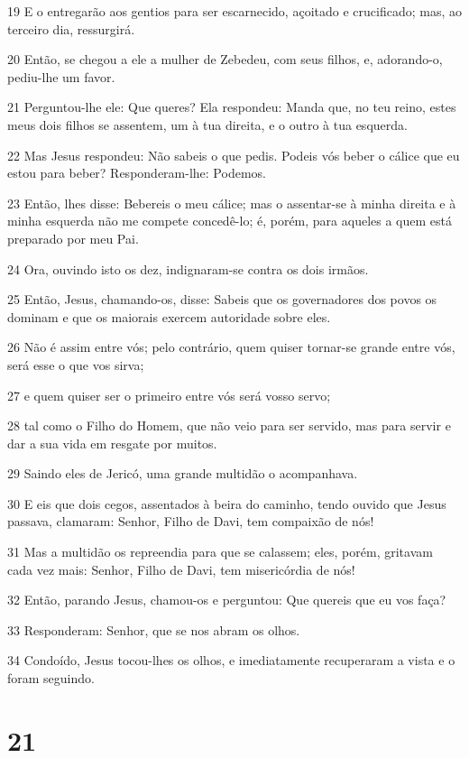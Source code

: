 \par 19 E o entregarão aos gentios para ser escarnecido, açoitado e crucificado; mas, ao terceiro dia, ressurgirá.
\par 20 Então, se chegou a ele a mulher de Zebedeu, com seus filhos, e, adorando-o, pediu-lhe um favor.
\par 21 Perguntou-lhe ele: Que queres? Ela respondeu: Manda que, no teu reino, estes meus dois filhos se assentem, um à tua direita, e o outro à tua esquerda.
\par 22 Mas Jesus respondeu: Não sabeis o que pedis. Podeis vós beber o cálice que eu estou para beber? Responderam-lhe: Podemos.
\par 23 Então, lhes disse: Bebereis o meu cálice; mas o assentar-se à minha direita e à minha esquerda não me compete concedê-lo; é, porém, para aqueles a quem está preparado por meu Pai.
\par 24 Ora, ouvindo isto os dez, indignaram-se contra os dois irmãos.
\par 25 Então, Jesus, chamando-os, disse: Sabeis que os governadores dos povos os dominam e que os maiorais exercem autoridade sobre eles.
\par 26 Não é assim entre vós; pelo contrário, quem quiser tornar-se grande entre vós, será esse o que vos sirva;
\par 27 e quem quiser ser o primeiro entre vós será vosso servo;
\par 28 tal como o Filho do Homem, que não veio para ser servido, mas para servir e dar a sua vida em resgate por muitos.
\par 29 Saindo eles de Jericó, uma grande multidão o acompanhava.
\par 30 E eis que dois cegos, assentados à beira do caminho, tendo ouvido que Jesus passava, clamaram: Senhor, Filho de Davi, tem compaixão de nós!
\par 31 Mas a multidão os repreendia para que se calassem; eles, porém, gritavam cada vez mais: Senhor, Filho de Davi, tem misericórdia de nós!
\par 32 Então, parando Jesus, chamou-os e perguntou: Que quereis que eu vos faça?
\par 33 Responderam: Senhor, que se nos abram os olhos.
\par 34 Condoído, Jesus tocou-lhes os olhos, e imediatamente recuperaram a vista e o foram seguindo.

\chapter{21}

